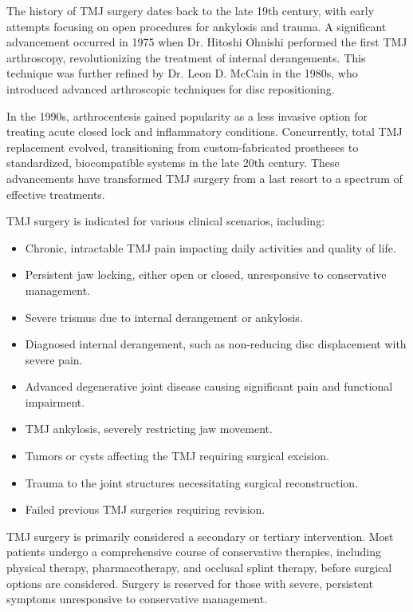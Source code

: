 The history of TMJ surgery dates back to the late 19th century, with early attempts focusing on open procedures for ankylosis and trauma. A significant advancement occurred in 1975 when Dr. Hitoshi Ohnishi performed the first TMJ arthroscopy, revolutionizing the treatment of internal derangements. This technique was further refined by Dr. Leon D. McCain in the 1980s, who introduced advanced arthroscopic techniques for disc repositioning.

In the 1990s, arthrocentesis gained popularity as a less invasive option for treating acute closed lock and inflammatory conditions. Concurrently, total TMJ replacement evolved, transitioning from custom-fabricated prostheses to standardized, biocompatible systems in the late 20th century. These advancements have transformed TMJ surgery from a last resort to a spectrum of effective treatments.

TMJ surgery is indicated for various clinical scenarios, including:

\begin{itemize}
  \item Chronic, intractable TMJ pain impacting daily activities and quality of life.
  \item Persistent jaw locking, either open or closed, unresponsive to conservative management.
  \item Severe trismus due to internal derangement or ankylosis.
  \item Diagnosed internal derangement, such as non-reducing disc displacement with severe pain.
  \item Advanced degenerative joint disease causing significant pain and functional impairment.
  \item TMJ ankylosis, severely restricting jaw movement.
  \item Tumors or cysts affecting the TMJ requiring surgical excision.
  \item Trauma to the joint structures necessitating surgical reconstruction.
  \item Failed previous TMJ surgeries requiring revision.
\end{itemize}

TMJ surgery is primarily considered a secondary or tertiary intervention. Most patients undergo a comprehensive course of conservative therapies, including physical therapy, pharmacotherapy, and occlusal splint therapy, before surgical options are considered. Surgery is reserved for those with severe, persistent symptoms unresponsive to conservative management.

